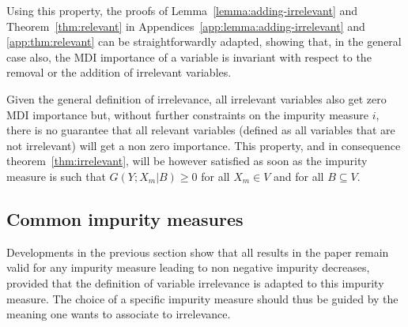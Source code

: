 \documentclass{article}
\begin{document}


Using this property, the proofs of Lemma~\ref{lemma:adding-irrelevant}
and Theorem~\ref{thm:relevant} in
Appendices~\ref{app:lemma:adding-irrelevant} and
\ref{app:thm:relevant} can be straightforwardly adapted, showing that,
in the general case also, the MDI importance of a variable is
invariant with respect to the removal or the addition of irrelevant
variables.

Given the general definition of irrelevance, all irrelevant variables
also get zero MDI importance but, without further constraints on the
impurity measure $i$, there is no guarantee that all relevant
variables (defined as all variables that are not irrelevant) will get
a non zero importance. This property, and in consequence
theorem~\ref{thm:irrelevant}, will be however satisfied as soon as the
impurity measure is such that $G(Y;X_m|B)\geq 0$ for all $X_m\in V$
and for all $B\subseteq V$.

\subsection{Common impurity measures}

Developments in the previous section show that all results in the
paper remain valid for any impurity measure leading to non negative
impurity decreases, provided that the definition of variable
irrelevance is adapted to this impurity measure. The choice of a
specific impurity measure should thus be guided by the meaning one
wants to associate to irrelevance.
\end{document}

